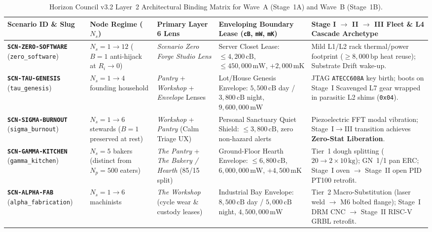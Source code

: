 \begin{table}[htbp]
\centering
\caption{Horizon Council v3.2 Layer~2 Architectural Binding Matrix for Wave~A (Stage~1A) and Wave~B (Stage~1B).}
\label{tab:l2-waves-ab-matrix}
\footnotesize
\begin{tabular}{@{}p{2.3cm}p{2.0cm}p{3.0cm}p{3.0cm}p{3.4cm}@{}}
\toprule
\textbf{Scenario ID \& Slug} & \textbf{Node Regime ($N_s$)} & \textbf{Primary Layer 6 Lens} & \textbf{Enveloping Boundary Lease (\texttt{cB}, \texttt{mW}, \texttt{mK})} & \textbf{Stage I $\to$ II $\to$ III Fleet \& L4 Cascade Archetype} \\
\midrule
\textbf{\texttt{SCN-ZERO-SOFTWARE}} (\texttt{zero\_software}) & $N_s = 1 \to 12$ ($B=1$ anti-hijack at $R_i \to 0$) & \textit{Scenario Zero Forge Studio Lens} & Server Closet Lease: $\le 4{,}200\,\mathrm{cB}$, $\le 450{,}000\,\mathrm{mW}$, $+2{,}000\,\mathrm{mK}$ & Mild L1/L2 rack thermal/power footprint ($\ge 8{,}000\,\mathrm{bp}$ heat reuse); Substrate Drift wake-up. \\
\addlinespace[3pt]
\textbf{\texttt{SCN-TAU-GENESIS}} (\texttt{tau\_genesis}) & $N_s = 1 \to 4$ founding household & \textit{Pantry} + \textit{Workshop} + \textit{Envelope} Lenses & Lot/House Genesis Envelope: $5{,}500\,\mathrm{cB}$ day / $3{,}800\,\mathrm{cB}$ night, $9{,}600{,}000\,\mathrm{mW}$ & JTAG \texttt{ATECC608A} key birth; boots on Stage~I Scavenged L7 gear wrapped in parasitic L2 shims (\texttt{0x04}). \\
\addlinespace[3pt]
\textbf{\texttt{SCN-SIGMA-BURNOUT}} (\texttt{sigma\_burnout}) & $N_s = 1 \to 6$ stewards ($B=1$ preserved at rest) & \textit{Workshop} + \textit{Pantry} (Calm Triage UX) & Personal Sanctuary Quiet Shield: $\le 3{,}800\,\mathrm{cB}$, zero non-hazard alerts & Piezoelectric FFT modal vibration; Stage~I$\to$III transition achieves \textbf{Zero-Stat Liberation}. \\
\addlinespace[3pt]
\textbf{\texttt{SCN-GAMMA-KITCHEN}} (\texttt{gamma\_kitchen}) & $N_s = 5$ bakers (distinct from $N_p = 500$ eaters) & \textit{The Pantry} + \textit{The Bakery / Hearth} (85/15 split) & Ground-Floor Hearth Envelope: $\le 6{,}800\,\mathrm{cB}$, $6{,}000{,}000\,\mathrm{mW}$, $+4{,}500\,\mathrm{mK}$ & Tier~1 dough splitting ($20 \to 2\times 10\,\mathrm{kg}$); GN~1/1 pan ERC; Stage~I oven $\to$ Stage~II open PID PT100 retrofit. \\
\addlinespace[3pt]
\textbf{\texttt{SCN-ALPHA-FAB}} (\texttt{alpha\_fabrication}) & $N_s = 1 \to 6$ machinists & \textit{The Workshop} (cycle wear \& custody leases) & Industrial Bay Envelope: $8{,}500\,\mathrm{cB}$ day / $5{,}000\,\mathrm{cB}$ night, $4{,}500{,}000\,\mathrm{mW}$ & Tier~2 Macro-Substitution (laser weld $\to$ M6 bolted flange); Stage~I DRM CNC $\to$ Stage~II RISC-V GRBL retrofit. \\

\end{tabular}
\end{table}
